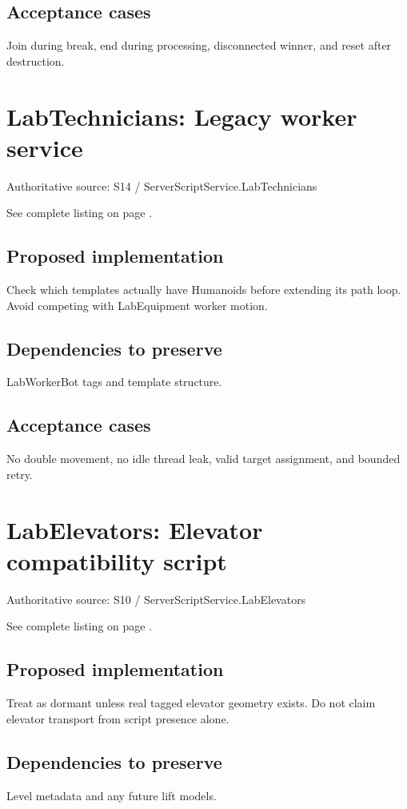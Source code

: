 \subsection{Acceptance cases}
Join during break, end during processing, disconnected winner, and reset after destruction.\allowbreak{}

\section{LabTechnicians: Legacy worker service}
Authoritative source: S14 /\allowbreak{} ServerScriptService.\allowbreak{}LabTechnicians

See complete listing on page \pageref{src:S14}.

\subsection{Proposed implementation}
Check which templates actually have Humanoids before extending its path loop.\allowbreak{} Avoid competing with LabEquipment worker motion.\allowbreak{}

\subsection{Dependencies to preserve}
LabWorkerBot tags and template structure.\allowbreak{}

\subsection{Acceptance cases}
No double movement, no idle thread leak, valid target assignment, and bounded retry.\allowbreak{}

\section{LabElevators: Elevator compatibility script}
Authoritative source: S10 /\allowbreak{} ServerScriptService.\allowbreak{}LabElevators

See complete listing on page \pageref{src:S10}.

\subsection{Proposed implementation}
Treat as dormant unless real tagged elevator geometry exists.\allowbreak{} Do not claim elevator transport from script presence alone.\allowbreak{}

\subsection{Dependencies to preserve}
Level metadata and any future lift models.\allowbreak{}

